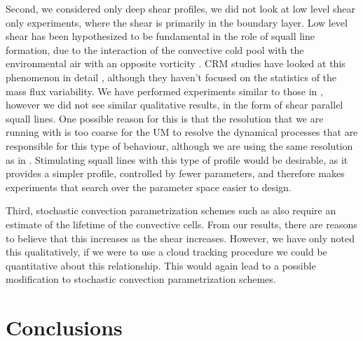 \documentclass[11pt,a4paper]{article}
\newcommand\todo[1]{\textbf{TODO: #1}}
\begin{document}
Second, we considered only deep shear profiles, we did not look at low level shear only experiments, where the shear is primarily in the boundary layer. Low level shear has been hypothesized to be fundamental in the role of squall line formation, due to the interaction of the convective cold pool with the environmental air with an opposite vorticity \parencite{RKW1988}. CRM studies have looked at this phenomenon in detail \parencite{RE2001, another}, although they haven't focused on the statistics of the mass flux variability. We have performed experiments similar to those in \cite{RE2001}, however we did not see similar qualitative results, in the form of shear parallel squall lines. One possible reason for this is that the resolution that we are running with is too coarse for the UM to resolve the dynamical processes that are responsible for this type of behaviour, although we are using the same resolution as in \cite{RE2001}. Stimulating squall lines with this type of profile would be desirable, as it provides a simpler profile, controlled by fewer parameters, and therefore makes experiments that search over the parameter space easier to design.

Third, stochastic convection parametrization schemes such as \cite{PC2008} also require an estimate of the lifetime of the convective cells. From our results, there are reasons to believe that this increases as the shear increases. However, we have only noted this qualitatively, if we were to use a cloud tracking procedure we could be quantitative about this relationship. This would again lead to a possible modification to stochastic convection parametrization schemes.


\section{Conclusions}
%
\end{document}
